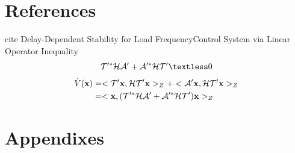 \documentclass[twocolumn]{autart}    %
\begin{document}
\section{References}
cite Delay-Dependent Stability for Load FrequencyControl System via Linear Operator Inequality 
\begin{equation}
    \begin{aligned}
        \setlength{\arraycolsep}{0.9pt}
        \mathcal{T}'^{*}\mathcal{H}\mathcal{A}'+\mathcal{A}'^{*}\mathcal{H}\mathcal{T}' \textless 0
    \end{aligned}
\end{equation}
\begin{equation}
    \begin{aligned}
        \setlength{\arraycolsep}{0.9pt}
        \dot{V}(\bold{x}) &= <\mathcal{T}'\bold{x},\mathcal{H}\mathcal{T}'\bold{x}>_{Z} + <\mathcal{A}'\bold{x},\mathcal{H}\mathcal{T}'\bold{x}>_{Z} \\ &=<\bold{x},(\mathcal{T}'^{*}\mathcal{H}\mathcal{A}'+\mathcal{A}'^{*}\mathcal{H}\mathcal{T}')\bold{x}>_{Z}  
    \end{aligned}
\end{equation}

\section{Appendixes}
\end{document}
